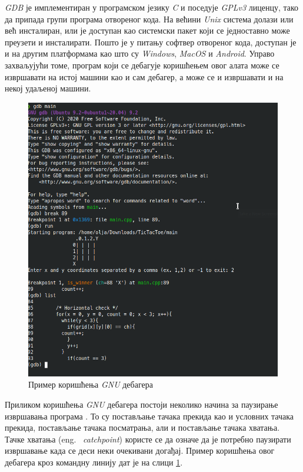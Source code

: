 \documentclass[a4paper]{article}
\begin{document}
{\em GDB} је имплементиран у програмском језику {\em C} и поседује
{\em GPLv3} лиценцу, тако да припада групи програма отвореног кода.
На већини {\em Unix} система долази или већ инсталиран, или је доступан
као системски пакет који се једноставно може преузети и инсталирати.
Пошто је у питању софтвер отвореног кода, доступан је и на другим
платформама као што су {\em Windows}, {\em MacOS} и {\em Android}. 
Управо захваљујући томе, програм који се дебагује коришћењем овог 
алата може се извршавати на истој машини као и сам дебагер, а може
се и извршавати и на некој удаљеној машини.

\begin{figure}
    \begin{center}
        \includegraphics[scale=0.4]{slike/gdb.png}
    \end{center}
    \caption{Пример коришћења {\em GNU} дебагера}
    \label{fig:gdb}
\end{figure}

Приликом коришћења {\em GNU} дебагера постоји неколико начина за 
паузирање извршавања програма \cite{artOfDebugging}. То су
постављање тачака прекида као и условних тачака прекида, постављање тачака
посматрања, али и постављање тачака хватања. Тачке хватања (eng. ~{\em catchpoint}) 
користе се да означе да је потребно паузирати извршавање када се деси неки очекивани догађај.
Пример коришћења овог дебагера кроз командну линију дат је на 
слици \ref{fig:gdb}.
\end{document}
